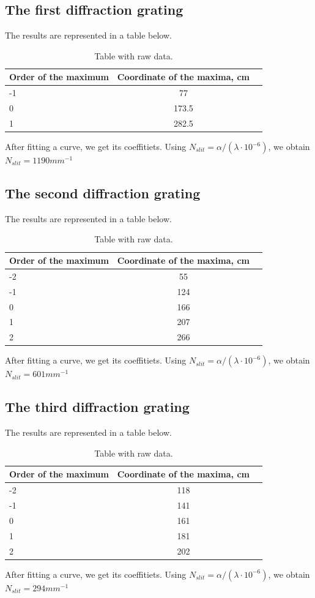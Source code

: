 \documentclass[a4paper, 12pt]{article}
\begin{document}
	\subsection*{The first diffraction grating}
	The results are represented in a table below.
	\begin{table}[H]
		\centering
		\caption{Table with raw data.}
		\begin{tabular}[t]{lcc}
			\hline
			Order of the maximum&Coordinate of the maxima, cm\\
			\hline
			-1&77\\
			0&173.5\\
			1&282.5\\
			\hline
		\end{tabular}
	\end{table}
	After fitting a curve, we get its coeffitiets. Using $N_{slit} = \alpha / (\lambda \cdot 10^{-6})$, we obtain $N_{slit} = 1190 mm^{-1}$
	\subsection*{The second diffraction grating}
	The results are represented in a table below.
	\begin{table}[H]
		\centering
		\caption{Table with raw data.}
		\begin{tabular}[t]{lcc}
			\hline
			Order of the maximum&Coordinate of the maxima, cm\\
			\hline
			-2&55\\
			-1&124\\
			0&166\\
			1&207\\
			2&266\\
			\hline
		\end{tabular}
	\end{table}
	After fitting a curve, we get its coeffitiets. Using $N_{slit} = \alpha / (\lambda \cdot 10^{-6})$, we obtain $N_{slit} = 601 mm^{-1}$
	\subsection*{The third diffraction grating}
	The results are represented in a table below.
	\begin{table}[H]
		\centering
		\caption{Table with raw data.}
		\begin{tabular}[t]{lcc}
			\hline
			Order of the maximum&Coordinate of the maxima, cm\\
			\hline
			-2&118\\
			-1&141\\
			0&161\\
			1&181\\
			2&202\\
			\hline
		\end{tabular}
	\end{table}
	After fitting a curve, we get its coeffitiets. Using $N_{slit} = \alpha / (\lambda \cdot 10^{-6})$, we obtain $N_{slit} = 294 mm^{-1}$
\end{document}
